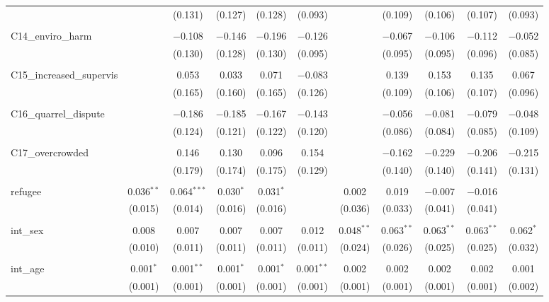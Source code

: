 \begin{table}[H]
\begin{tabular}{@{\extracolsep{4pt}}lcccccccccc}
  &  & (0.131) & (0.127) & (0.128) & (0.093) &  & (0.109) & (0.106) & (0.107) & (0.093) \\ 
  & & & & & & & & & & \\ 
 C14\_enviro\_harm &  & $-$0.108 & $-$0.146 & $-$0.196 & $-$0.126 &  & $-$0.067 & $-$0.106 & $-$0.112 & $-$0.052 \\ 
  &  & (0.130) & (0.128) & (0.130) & (0.095) &  & (0.095) & (0.095) & (0.096) & (0.085) \\ 
  & & & & & & & & & & \\ 
 C15\_increased\_supervis &  & 0.053 & 0.033 & 0.071 & $-$0.083 &  & 0.139 & 0.153 & 0.135 & 0.067 \\ 
  &  & (0.165) & (0.160) & (0.165) & (0.126) &  & (0.109) & (0.106) & (0.107) & (0.096) \\ 
  & & & & & & & & & & \\ 
 C16\_quarrel\_dispute &  & $-$0.186 & $-$0.185 & $-$0.167 & $-$0.143 &  & $-$0.056 & $-$0.081 & $-$0.079 & $-$0.048 \\ 
  &  & (0.124) & (0.121) & (0.122) & (0.120) &  & (0.086) & (0.084) & (0.085) & (0.109) \\ 
  & & & & & & & & & & \\ 
 C17\_overcrowded &  & 0.146 & 0.130 & 0.096 & 0.154 &  & $-$0.162 & $-$0.229 & $-$0.206 & $-$0.215 \\ 
  &  & (0.179) & (0.174) & (0.175) & (0.129) &  & (0.140) & (0.140) & (0.141) & (0.131) \\ 
  & & & & & & & & & & \\ 
 refugee & 0.036$^{**}$ & 0.064$^{***}$ & 0.030$^{*}$ & 0.031$^{*}$ &  & 0.002 & 0.019 & $-$0.007 & $-$0.016 &  \\ 
  & (0.015) & (0.014) & (0.016) & (0.016) &  & (0.036) & (0.033) & (0.041) & (0.041) &  \\ 
  & & & & & & & & & & \\ 
 int\_sex & 0.008 & 0.007 & 0.007 & 0.007 & 0.012 & 0.048$^{**}$ & 0.063$^{**}$ & 0.063$^{**}$ & 0.063$^{**}$ & 0.062$^{*}$ \\ 
  & (0.010) & (0.011) & (0.011) & (0.011) & (0.011) & (0.024) & (0.026) & (0.025) & (0.025) & (0.032) \\ 
  & & & & & & & & & & \\ 
 int\_age & 0.001$^{*}$ & 0.001$^{**}$ & 0.001$^{*}$ & 0.001$^{*}$ & 0.001$^{**}$ & 0.002 & 0.002 & 0.002 & 0.002 & 0.001 \\ 
  & (0.001) & (0.001) & (0.001) & (0.001) & (0.001) & (0.001) & (0.001) & (0.001) & (0.001) & (0.002) \\ 

\end{tabular}
\end{table}
